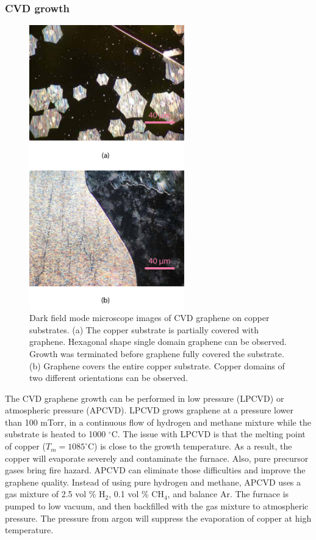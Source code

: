 \documentclass[pdflatex, sectionletters, 12pt, final, phd]{pittetd}    %
\begin{document}
\subsubsection{CVD growth}

\begin{figure}[p]
	\centering
	\includegraphics[width=0.6\textwidth]{Drawing/CVDGraphene.pdf}
	\caption[Dark field mode microscope images of CVD graphene on copper substrates]{Dark field mode microscope images of CVD graphene on copper substrates. (a) The copper substrate is partially covered with graphene. Hexagonal shape single domain graphene can be observed. Growth was terminated before graphene fully covered the substrate. (b) Graphene covers the entire copper substrate. Copper domains of two different orientations can be observed.}
	\label{FIG:CVDGraphene}
\end{figure}

The CVD graphene growth can be performed in low pressure (LPCVD) or atmospheric pressure (APCVD). LPCVD grows graphene at a pressure lower than 100 mTorr, in a continuous flow of hydrogen and methane mixture while the substrate is heated to 1000 $^{\circ}$C. The issue with LPCVD is that the melting point of copper ($T_m = 1085^{\circ}$C) is close to the growth temperature. As a result, the copper will evaporate severely and contaminate the furnace\cite{vlassiouk2013large}. Also, pure precursor gases bring fire hazard. APCVD can eliminate those difficulties and improve the graphene quality\cite{vlassiouk2013large, dhingra2015quadratic}. Instead of using pure hydrogen and methane, APCVD uses a gas mixture of 2.5 vol \% H$_2$, 0.1 vol \% CH$_4$, and balance Ar. The furnace is pumped to low vacuum, and then backfilled with the gas mixture to atmospheric pressure. The pressure from argon will suppress the evaporation of copper at high temperature. 
\end{document}
